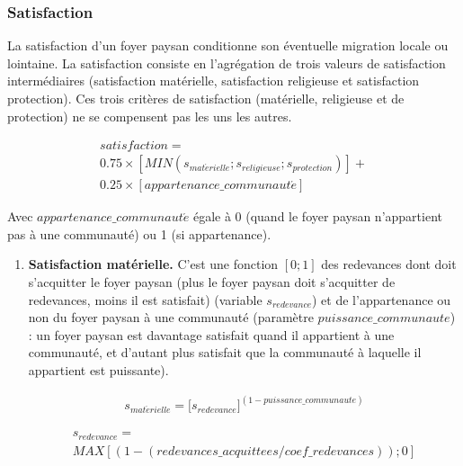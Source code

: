 \documentclass[a4paper,11pt]{article}
\begin{document}
{\subsubsection{Satisfaction}
\begin{sloppypar}
La satisfaction d'un foyer paysan conditionne son éventuelle migration locale ou lointaine. La satisfaction consiste en l'agrégation de trois valeurs de satisfaction intermédiaires (satisfaction matérielle, satisfaction religieuse et satisfaction protection). Ces trois critères de satisfaction (matérielle, religieuse et de protection) ne se compensent pas les uns les autres.
\begin{small}
\begin{equation}
\begin{gathered}
satisfaction =\\0.75 \times [MIN (s_{mat\acute{e}rielle} ; s_ {religieuse}; s_{protection})] +\\0.25 \times [appartenance\_communaut\acute{e}]
\end{gathered}
\end{equation}
\end{small}

Avec $appartenance\_communaut\acute{e}$ égale à 0 (quand le foyer paysan n'appartient pas à une communauté) ou 1 (si appartenance).

\begin{enumerate}
  \item \textbf{Satisfaction matérielle.} 
  C'est une fonction $[0;1]$ des redevances dont doit s'acquitter le foyer paysan (plus le foyer paysan doit s'acquitter de redevances, moins il est satisfait) (variable $s_{redevance}$) et de l'appartenance ou non du foyer paysan à une communauté (paramètre $puissance\_communaute$) : un foyer paysan est davantage satisfait quand il appartient à une communauté, et d'autant plus satisfait que la communauté à laquelle il appartient est puissante).

\begin{small}
\begin{equation}\label{eq:Smat}
\begin{gathered}
s_{mat\acute{e}rielle} =\lbrack s_{redevance}\rbrack^{(1-puissance\_communaute)}
\end{gathered}
\end{equation}

\begin{equation}
\begin{gathered}
s_{redevance} =\\ MAX [ (1- (redevances\_acquittees / coef\_redevances)) ; 0]
\end{gathered}
\end{equation}
\end{small}


\end{enumerate}
\end{sloppypar}}
\end{document}

